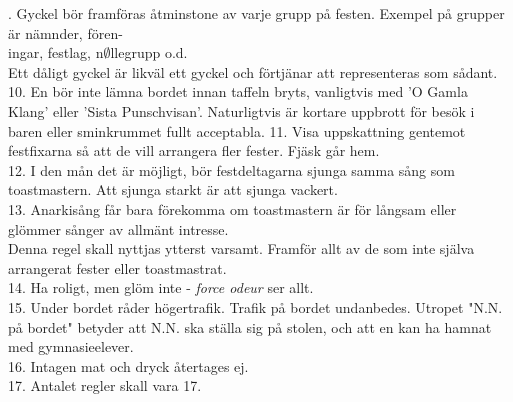 \documentclass[a6paper, 10pt, twoside]{article}
\begin{document}
. Gyckel bör framföras åtminstone av varje grupp på festen. Exempel på grupper är nämnder, fören-\\ingar, festlag, n$\emptyset$llegrupp o.d. \\Ett dåligt gyckel är likväl ett gyckel och förtjänar att representeras som sådant.
\vspace{5pt} \\
10. En bör inte lämna bordet innan taffeln bryts, vanligtvis med 'O Gamla Klang' eller 'Sista Punschvisan'. Naturligtvis är kortare uppbrott för besök i baren eller sminkrummet fullt acceptabla.\vspace{5pt}   
11. Visa uppskattning gentemot festfixarna så att de vill arrangera fler fester. Fjäsk går hem.
\vspace{5pt} \\
12. I den mån det är möjligt, bör festdeltagarna sjunga samma sång som toastmastern. Att sjunga starkt är att sjunga vackert.
\vspace{5pt} \\
13. Anarkisång får bara förekomma om toastmastern är för långsam eller glömmer sånger av allmänt intresse.\\ Denna regel skall nyttjas ytterst varsamt. Framför allt av de som inte själva arrangerat fester eller toastmastrat.
\vspace{5pt} \\
14. Ha roligt, men glöm inte - \textit{force odeur} ser allt.
\vspace{-11pt}
\vspace{5pt}   \\
15. Under bordet råder högertrafik. Trafik på bordet undanbedes. Utropet "N.N. på bordet" betyder att N.N. ska ställa sig på stolen, och att en kan ha hamnat med gymnasieelever.
\vspace{5pt} \\
16. Intagen mat och dryck återtages ej.
\vspace{5pt} \\
17. Antalet regler skall vara 17.
\end{document}
